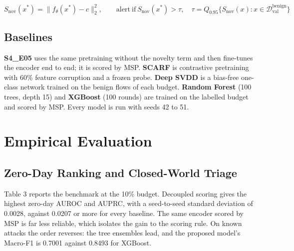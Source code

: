 \documentclass[10pt,a4paper]{article}
\begin{document}
\begin{equation}
S_{\mathrm{nov}}(x^{*}) = \| f_\theta(x^{*}) - c \|_2^2, \qquad \mathrm{alert\ if\ } S_{\mathrm{nov}}(x^{*}) > \tau, \quad \tau = Q_{0.95}\{ S_{\mathrm{nov}}(x) : x \in \mathcal{D}_{\mathrm{val}}^{\mathrm{benign}} \}
\end{equation}
\subsection{Baselines}
\textbf{S4\_E05} uses the same pretraining without the novelty term and then fine-tunes the encoder end to end; it is scored by MSP. \textbf{SCARF} is contrastive pretraining with 60\% feature corruption and a frozen probe. \textbf{Deep SVDD} is a bias-free one-class network trained on the benign flows of each budget. \textbf{Random Forest} (100 trees, depth 15) and \textbf{XGBoost} (100 rounds) are trained on the labelled budget and scored by MSP. Every model is run with seeds 42 to 51.

\section{Empirical Evaluation}
\subsection{Zero-Day Ranking and Closed-World Triage}
Table 3 reports the benchmark at the 10\% budget. Decoupled scoring gives the highest zero-day AUROC and AUPRC, with a seed-to-seed standard deviation of 0.0028, against 0.0207 or more for every baseline. The same encoder scored by MSP is far less reliable, which isolates the gain to the scoring rule. On known attacks the order reverses: the tree ensembles lead, and the proposed model's Macro-F1 is 0.7001 against 0.8493 for XGBoost.
\end{document}
